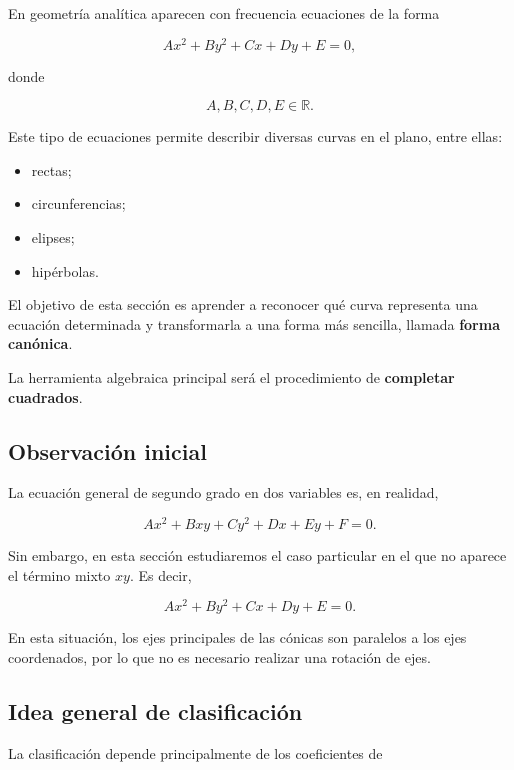 \documentclass[12pt]{article}
\theoremstyle{plain}
\theoremstyle{definition}
\theoremstyle{remark}
\begin{document}
{En geometría analítica aparecen con frecuencia ecuaciones de la forma

\[
Ax^2+By^2+Cx+Dy+E=0,
\]

donde

\[
A,B,C,D,E\in\mathbb{R}.
\]

Este tipo de ecuaciones permite describir diversas curvas en el plano,
entre ellas:

\begin{itemize}
    \item rectas;
    \item circunferencias;
    \item elipses;
    \item hipérbolas.
\end{itemize}

El objetivo de esta sección es aprender a reconocer qué curva representa
una ecuación determinada y transformarla a una forma más sencilla,
llamada \textbf{forma canónica}.

La herramienta algebraica principal será el procedimiento de
\textbf{completar cuadrados}.

\subsection*{Observación inicial}

La ecuación general de segundo grado en dos variables es, en realidad,

\[
Ax^2+Bxy+Cy^2+Dx+Ey+F=0.
\]

Sin embargo, en esta sección estudiaremos el caso particular en el que no
aparece el término mixto \(xy\). Es decir,

\[
\boxed{
Ax^2+By^2+Cx+Dy+E=0
}.
\]

En esta situación, los ejes principales de las cónicas son paralelos a
los ejes coordenados, por lo que no es necesario realizar una rotación
de ejes.

\subsection*{Idea general de clasificación}

La clasificación depende principalmente de los coeficientes de

}
\end{document}
